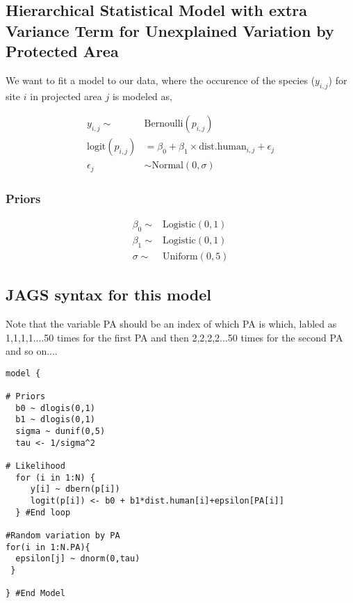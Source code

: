 \documentclass[12pt]{article}
\begin{document}
\subsection{Hierarchical Statistical Model with extra Variance Term for Unexplained Variation by Protected Area}

\Large

We want to fit a model to our data, where the occurence of the species ($y_{i,j}$) for site $i$ in projected area $j$ is modeled as,

\begin{align*}
y_{i,j}\sim& \text{Bernoulli}(p_{i,j})\\
\text{logit}(p_{i,j}) &= \beta_{0} + \beta_{1}\times \text{dist.human}_{i,j}+ \epsilon_{j}\\
\epsilon_{j} &\sim \text{Normal}(0,\sigma)
\end{align*}

\subsubsection{Priors}

\begin{align*}
\beta_{0} \sim& \text{Logistic}(0, 1)\\
\beta_{1} \sim& \text{Logistic}(0, 1)\\
\sigma \sim& \text{Uniform}(0,5)
\end{align*}


\pagebreak

\subsection{JAGS syntax for this model}

Note that the variable PA should be an index of which PA is which, labled as 1,1,1,1....50 times for the first PA and then 2,2,2,2...50 times for the second PA and so on....

\begin{verbatim}
model {

# Priors
  b0 ~ dlogis(0,1)
  b1 ~ dlogis(0,1)
  sigma ~ dunif(0,5)
  tau <- 1/sigma^2

# Likelihood
  for (i in 1:N) {
     y[i] ~ dbern(p[i])
     logit(p[i]) <- b0 + b1*dist.human[i]+epsilon[PA[i]]
  } #End loop

#Random variation by PA
for(i in 1:N.PA){
  epsilon[j] ~ dnorm(0,tau)
 }
 
} #End Model
\end{verbatim}
\end{document}
